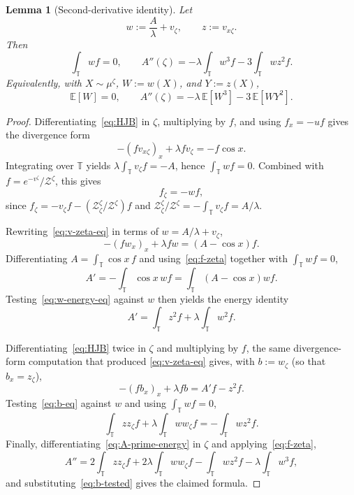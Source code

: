 \documentclass{amsart}
\newtheorem{lemma}[theorem]{Lemma}
\newcommand{\T}{\mathbb T}
\begin{document}
\begin{lemma}[Second-derivative identity]\label{lem:second-deriv}
Let
\[
w:=\frac{A}{\lambda}+v_\zeta,\qquad z:=v_{x\zeta}.
\]
Then
\[
\int_\T wf=0,\qquad
A''(\zeta)=-\lambda\int_\T w^3f-3\int_\T wz^2f .
\]
Equivalently, with $X\sim\mu^\zeta$, $W:=w(X)$, and $Y:=z(X)$,
\[
\mathbb E[W]=0,\qquad
A''(\zeta)=-\lambda\,\mathbb E[W^3]-3\,\mathbb E[WY^2].
\]
\end{lemma}
\begin{proof}
Differentiating~\eqref{eq:HJB} in $\zeta$, multiplying by $f$, and
using $f_x=-uf$ gives the divergence form
\begin{equation}\label{eq:v-zeta-eq}
-(fv_{x\zeta})_x+\lambda fv_\zeta=-f\cos x.
\end{equation}
Integrating over $\T$ yields $\lambda\int_\T v_\zeta f=-A$, hence
$\int_\T wf=0$. Combined with $f=e^{-v^\zeta}/\mathcal Z^\zeta$, this gives
\begin{equation}\label{eq:f-zeta}
f_\zeta=-wf,
\end{equation}
since $f_\zeta=-v_\zeta f-(\mathcal Z^\zeta_\zeta/\mathcal Z^\zeta)f$ and
$\mathcal Z^\zeta_\zeta/\mathcal Z^\zeta=-\int_\T v_\zeta f=A/\lambda$.

Rewriting~\eqref{eq:v-zeta-eq} in terms of $w=A/\lambda+v_\zeta$,
\begin{equation}\label{eq:w-energy-eq}
-(fw_x)_x+\lambda fw=(A-\cos x)f .
\end{equation}
Differentiating $A=\int_\T\cos x\,f$ and using~\eqref{eq:f-zeta}
together with $\int_\T wf=0$,
\[
A'=-\int_\T \cos x\,wf=\int_\T (A-\cos x)wf .
\]
Testing~\eqref{eq:w-energy-eq} against $w$ then yields the energy
identity
\begin{equation}\label{eq:A-prime-energy}
A'=\int_\T z^2f+\lambda\int_\T w^2f .
\end{equation}

Differentiating~\eqref{eq:HJB} twice in $\zeta$ and multiplying by
$f$, the same divergence-form computation that produced
\eqref{eq:v-zeta-eq} gives, with $b:=w_\zeta$ (so that $b_x=z_\zeta$),
\begin{equation}\label{eq:b-eq}
-(fb_x)_x+\lambda fb=A'f-z^2f .
\end{equation}
Testing~\eqref{eq:b-eq} against $w$ and using $\int_\T wf=0$,
\begin{equation}\label{eq:b-tested}
\int_\T zz_\zeta f+\lambda\int_\T ww_\zeta f
=-\int_\T wz^2f .
\end{equation}
Finally, differentiating~\eqref{eq:A-prime-energy} in $\zeta$ and
applying~\eqref{eq:f-zeta},
\[
A''=2\int_\T zz_\zeta f+2\lambda\int_\T ww_\zeta f
-\int_\T wz^2f-\lambda\int_\T w^3f,
\]
and substituting~\eqref{eq:b-tested} gives the claimed formula.
\end{proof}
\end{document}
